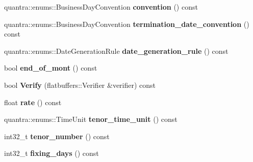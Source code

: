 \begin{DoxyCompactItemize}
\mbox{\label{structquantra_1_1FLATBUFFERS__FINAL__CLASS_a9aed3344e1ba628e7cbe9a1e62c53c97}} 
quantra\+::enums\+::\+Business\+Day\+Convention {\bfseries convention} () const
\item 
\mbox{\label{structquantra_1_1FLATBUFFERS__FINAL__CLASS_ae84453a225271d427f860b4a568ba5da}} 
quantra\+::enums\+::\+Business\+Day\+Convention {\bfseries termination\+\_\+date\+\_\+convention} () const
\item 
\mbox{\label{structquantra_1_1FLATBUFFERS__FINAL__CLASS_abdfcd290dfa885f10864e6443dd4dc11}} 
quantra\+::enums\+::\+Date\+Generation\+Rule {\bfseries date\+\_\+generation\+\_\+rule} () const
\item 
\mbox{\label{structquantra_1_1FLATBUFFERS__FINAL__CLASS_a4b9c21859e17ec63a2964bac8055bf96}} 
bool {\bfseries end\+\_\+of\+\_\+mont} () const
\item 
\mbox{\label{structquantra_1_1FLATBUFFERS__FINAL__CLASS_aed693ee5a45b5f53af7411f9cab6793a}} 
bool {\bfseries Verify} (flatbuffers\+::\+Verifier \&verifier) const
\item 
\mbox{\label{structquantra_1_1FLATBUFFERS__FINAL__CLASS_aa5a25f3bfb8a4b4822cb5fcb1b479ff8}} 
float {\bfseries rate} () const
\item 
\mbox{\label{structquantra_1_1FLATBUFFERS__FINAL__CLASS_ab4ab050747fb985c5b2628688cc3658d}} 
quantra\+::enums\+::\+Time\+Unit {\bfseries tenor\+\_\+time\+\_\+unit} () const
\item 
\mbox{\label{structquantra_1_1FLATBUFFERS__FINAL__CLASS_a6da14d412a4e94b493875c800389e10e}} 
int32\+\_\+t {\bfseries tenor\+\_\+number} () const
\item 
\mbox{\label{structquantra_1_1FLATBUFFERS__FINAL__CLASS_af545a8a6ad48fc2a0597341e9ae68026}} 
int32\+\_\+t {\bfseries fixing\+\_\+days} () const

\end{DoxyCompactItemize}

